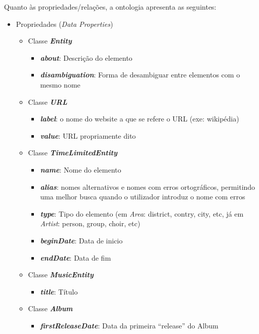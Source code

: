 \documentclass{article}
\begin{document}
Quanto às propriedades/relações, a ontologia apresenta as seguintes:
\begin{itemize}
    \item Propriedades (\textit{Data Properties})
    \begin{itemize}
        \item Classe \textbf{\textit{Entity}}
        \begin{itemize}
            \item \textbf{\textit{about}}: Descrição do elemento
            \item \textbf{\textit{disambiguation}}: Forma de desambiguar entre elementos com o mesmo nome
        \end{itemize}
        \item Classe \textbf{\textit{URL}}
        \begin{itemize}
            \item \textbf{\textit{label}}: o nome do website a que se refere o URL (exe: wikipédia)
            \item \textbf{\textit{value}}: URL propriamente dito
        \end{itemize}
        \item Classe \textbf{\textit{TimeLimitedEntity}}
        \begin{itemize}
            \item \textbf{\textit{name}}: Nome do elemento
            \item \textbf{\textit{alias}}: nomes alternativos e nomes com erros ortográficos, permitindo uma melhor busca quando o utilizador introduz o nome com erros 
            \item \textbf{\textit{type}}: Tipo do elemento (em \textit{Area}: district, contry, city, etc, já em \textit{Artist}: person, group, choir, etc)
            \item \textbf{\textit{beginDate}}: Data de inicio
            \item \textbf{\textit{endDate}}: Data de fim
        \end{itemize}
        \item Classe \textbf{\textit{MusicEntity}}
        \begin{itemize}
            \item \textbf{\textit{title}}: Título
        \end{itemize}
        \item Classe \textbf{\textit{Album}}
        \begin{itemize}
            \item \textbf{\textit{firstReleaseDate}}: Data da primeira ``release'' do Album

\end{itemize}
\end{itemize}
\end{itemize}
\end{document}
